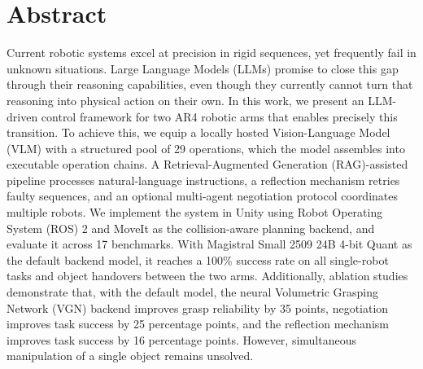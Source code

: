 \documentclass[
     12pt,
     a4paper,
     BCOR=10mm,
     DIV=14,
     listof=totoc,
     bibliography=totoc,
     parskip,
     twoside,
     headsepline
     ]{scrreprt}
\begin{document}
\cleardoublepage

\section*{Abstract}
Current robotic systems excel at precision in rigid sequences, yet frequently fail in unknown situations. Large Language Models (LLMs) promise to close this gap through their reasoning capabilities, even though they currently cannot turn that reasoning into physical action on their own. In this work, we present an LLM-driven control framework for two AR4 robotic arms that enables precisely this transition. To achieve this, we equip a locally hosted Vision-Language Model (VLM) with a structured pool of 29 operations, which the model assembles into executable operation chains. A Retrieval-Augmented Generation (RAG)-assisted pipeline processes natural-language instructions, a reflection mechanism retries faulty sequences, and an optional multi-agent negotiation protocol coordinates multiple robots. We implement the system in Unity using Robot Operating System (ROS) 2 and MoveIt as the collision-aware planning backend, and evaluate it across 17 benchmarks. With Magistral Small 2509 24B 4-bit Quant as the default backend model, it reaches a 100\% success rate on all single-robot tasks and object handovers between the two arms. Additionally, ablation studies demonstrate that, with the default model, the neural Volumetric Grasping Network (VGN) backend improves grasp reliability by 35 points, negotiation improves task success by 25 percentage points, and the reflection mechanism improves task success by 16 percentage points. However, simultaneous manipulation of a single object remains unsolved.

\clearpage
\end{document}
